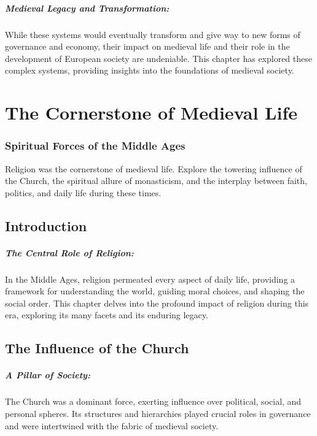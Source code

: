 \documentclass[a4paper,12pt]{book}
\begin{document}
\paragraph{Medieval Legacy and Transformation:}
While these systems would eventually transform and give way to new forms of governance and economy, their impact on medieval life and their role in the development of European society are undeniable. This chapter has explored these complex systems, providing insights into the foundations of medieval society.

\chapter{The Cornerstone of Medieval Life}
\subsection*{Spiritual Forces of the Middle Ages}
Religion was the cornerstone of medieval life. Explore the towering influence of the Church, the spiritual allure of monasticism, and the interplay between faith, politics, and daily life during these times.

\section*{Introduction}

\paragraph{The Central Role of Religion:}
In the Middle Ages, religion permeated every aspect of daily life, providing a framework for understanding the world, guiding moral choices, and shaping the social order. This chapter delves into the profound impact of religion during this era, exploring its many facets and its enduring legacy.

\section*{The Influence of the Church}

\paragraph{A Pillar of Society:}
The Church was a dominant force, exerting influence over political, social, and personal spheres. Its structures and hierarchies played crucial roles in governance and were intertwined with the fabric of medieval society.
\end{document}
